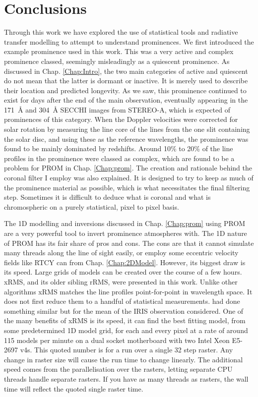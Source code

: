 \chapter{Conclusions}\label{Chap:conclusion}

Through this work we have explored the use of statistical tools and radiative transfer modelling to attempt to understand prominences. We first introduced the example prominence used in this work. This was a very active and complex prominence classed, seemingly misleadingly as a quiescent prominence. As discussed in Chap. \ref{Chap:Intro}, the two main categories of active and quiescent do not mean that the latter is dormant or inactive. It is merely used to describe their location and predicted longevity. As we saw, this prominence continued to exist for days after the end of the main observation, eventually appearing in the 171~\AA{} and 304~\AA{} SECCHI images from STEREO-A, which is expected of prominences of this category. When the Doppler velocities were corrected for solar rotation by measuring the line core of the \mgiihk{} lines from the one slit containing the solar disc, and using these as the reference wavelengths, the prominence was found to be mainly dominated by redshifts. Around 10\% to 20\% of the line profiles in the prominence were classed as complex, which are found to be a problem for PROM in Chap. \ref{Chap:prom}. The creation and rationale behind the coronal filter I employ was also explained. It is designed to try to keep as much of the prominence material as possible, which is what necessitates the final filtering step. Sometimes it is difficult to deduce what is coronal and what is chromospheric on a purely statistical, pixel to pixel basis. 

The 1D modelling and inversions discussed in Chap. \ref{Chap:prom} using PROM are a very powerful tool to invert prominence atmospheres with. The 1D nature of PROM has its fair share of pros and cons. The cons are that it cannot simulate many threads along the line of sight easily, or employ some eccentric velocity fields like RTCY can from Chap. \ref{Chap:2DModel}. However, its biggest draw is its speed. Large grids of models can be created over the course of a few hours. xRMS, and its older sibling rRMS, were presented in this work. Unlike other algorithms xRMS matches the line profiles point-for-point in wavelength space. It does not first reduce them to a handful of statistical measurements. \cite{heinzel_understanding_2015} had done something similar but for the mean of the IRIS \mgiihk{} observation considered. One of the many benefits of xRMS is its speed, it can find the best fitting model, from some predetermined 1D model grid, for each and every pixel at a rate of around 115 models per minute on a dual socket motherboard with two Intel Xeon E5-2697 v4s. This quoted number is for a run over a single 32 step raster. Any change in raster size will cause the run time to change linearly. The additional speed comes from the parallelisation over the rasters, letting separate CPU threads handle separate rasters. If you have as many threads as rasters, the wall time will reflect the quoted single raster time. 

